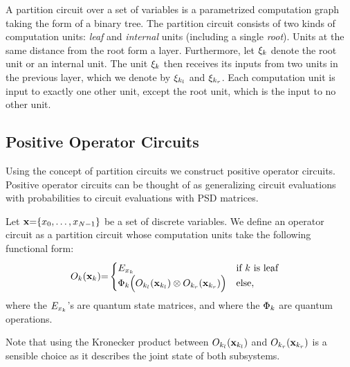 \begin{definition}
	\label{def:partition_circuit}
	A partition circuit over a set of variables is a parametrized computation graph taking the form of a binary tree. The partition circuit consists of two kinds of computation units:
	\textit{leaf} and \textit{internal} units (including a single \textit{root}).
	Units at the same distance from the root form a layer.
	Furthermore, let $\xi_k$ denote the root unit or an internal unit. The unit $\xi_k$ then receives its inputs from two units in the previous layer, which we denote by $\xi_{k_l}$ and $\xi_{k_r}$. Each computation unit is input to exactly one other unit, except the root unit, which is the input to no other unit.
\end{definition}






\subsection{Positive Operator Circuits}

Using the concept of partition circuits we construct positive operator circuits. Positive operator circuits can be thought of as generalizing circuit evaluations with probabilities to circuit evaluations with PSD matrices.
\begin{definition}
	\label{def:poc}
	Let   $\mathbf{x}{=}\{x_0,\dots ,x_{N{-}1}  \}$ be a set of discrete variables.
	We define an operator circuit as a partition circuit whose computation units take the following functional form:
	\begin{align}
		 & {O}_k(\mathbf{x}_k){=}
		\begin{cases}
			E_{x_k}
			 & \text{if $k$ is leaf}
			\\
			\Phi_k \Bigl(O_{k_l}(\mathbf{x}_{k_l}) \otimes O_{k_r}(\mathbf{x}_{k_r}) \Bigr)
			 & \text{else},
		\end{cases}
		\label{eq:poc:def}
	\end{align}
	where the  $E_{x_k}$'s are quantum state matrices, and where the $\Phi_k$ are quantum operations.
\end{definition}
Note that using the Kronecker product between $O_{k_l}(\mathbf{x}_{k_l})$ and  $O_{k_r}(\mathbf{x}_{k_r})$ is a sensible choice as it describes the joint state of both subsystems.




